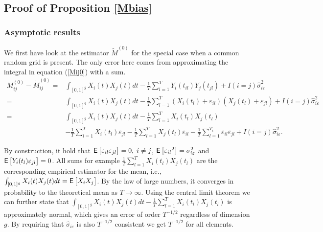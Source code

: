 \subsection{Proof of Proposition \ref{Mbias}}
\subsubsection{Asymptotic results} \label{M0}\label{Md}
We first have look at the estimator $\tilde{M}^{(0)}$ for the special case when a common random grid is present.  The only error here comes from approximating the integral in equation (\ref{Mij0}) with a sum. 
\begin{equation}
\begin{split}
 M^{(0)}_{ij}-\tilde{M}^{(0)}_{ij} =&\int_{[0,1]^g} X_i(t) X_j(t) dt -\frac{1}{T} \sum_{l=1}^{T} Y_i(t_{il}) Y_j(t_{jl})+ I(i = j )\hat{\sigma}_{i\varepsilon}^2\\
=&\int_{[0,1]^g} X_i(t) X_j(t) dt -\frac{1}{T} \sum_{l=1}^{T} \left( X_i(t_{l}) +\varepsilon_{il}\right) \left( X_j(t_{l})+\varepsilon_{jl} \right) + I(i = j )\hat{\sigma}_{i\varepsilon}^2\\
=&\int_{[0,1]^g} X_i(t)X_j(t) dt  -\frac{1}{T} \sum_{l=1}^{T} X_i(t_{l}) X_j(t_{l}) \\ 
& - \frac{1}{T} \sum_{l=1}^{T} X_i(t_{l})\varepsilon_{jl} - \frac{1}{T} \sum_{l=1}^{T} X_j(t_{l})\varepsilon_{il} - \frac{1}{T} \sum_{l=1}^{T_i} \varepsilon_{il}\varepsilon_{jl}+ I(i = j )\hat{\sigma}_{i\varepsilon}^2.
\end{split}
\end{equation}


By construction, it hold that $\mathop{\mbox{\sf E}}\left[  \varepsilon_{il}\varepsilon_{jl} \right] = 0,\; i \neq j$, $\mathop{\mbox{\sf E}}\left[ {\varepsilon_{il}}^2 \right] = \sigma_{i\varepsilon}^2$ and $ \mathop{\mbox{\sf E}}\left[ Y_i(t_{l})\varepsilon_{jl} \right] = 0$. 
All sums for example $\frac{1}{T}\sum_{l=1}^T X_i(t_l)X_j(t_l)$ are the corresponding empirical estimator for the mean, i.e., $\int_{[0,1]^g} X_i(t)X_j(t) dt=\mathop{\mbox{\sf E}} \left[X_iX_j\right]$. By the law of large numbers, it converges in probability to the theoretical mean as $T \rightarrow \infty$. Using the central limit theorem we can further state that $\int_{[0,1]^g} X_i(t)X_j(t) dt - \frac{1}{T} \sum_{l=1}^T X_i(t_l)X_j(t_l)$ is approximately normal, which gives an error of order $T^{-1/2}$ regardless of dimension $g$. By requiring that $\hat{\sigma}_{i\varepsilon}$ is also $T^{-1/2}$ consistent we get $T^{-1/2}$ for all elements. 

